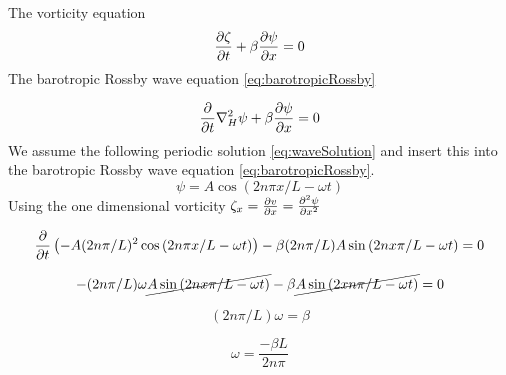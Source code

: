 The vorticity equation
\begin{equation}\label{eq:gov_vort}
    \pdv{\zeta}{t} + \beta \pdv{\psi}{x} = 0
\end{equation}
The barotropic Rossby wave equation \cref{eq:barotropicRossby}

\begin{equation}\label{eq:barotropicRossby}
    \frac{\partial}{\partial t}{} \nabla_H^2 \psi + \beta \pdv{\psi}{x} = 0
\end{equation}
We assume the following periodic solution \cref{eq:waveSolution} and
insert this into the barotropic Rossby wave equation \cref{eq:barotropicRossby}.
\begin{equation}\label{eq:waveSolution}
    \psi = A\cos{(2n\pi x /L - \omega t)}
\end{equation}
Using the one dimensional vorticity $\zeta_x = \pdv{v}{x} = \pdv[2]{\psi}{x}$

\begin{equation}
    \pdv{}{t} \left(-A (2n\pi/L)^2  \cos{(2n\pi x/L - \omega t)}\right) - \beta
     (2n\pi/L) A \sin{(2n x\pi/L - \omega t) = 0}
\end{equation}

\begin{equation}
    -(2n\pi/L)\omega \cancel{A\sin{(2n x\pi/L - \omega t)}} - \beta
    \cancel{A\sin{(2 xn\pi/L - \omega t)}} = 0
\end{equation}

\begin{equation}
    (2n\pi / L) \omega = \beta
\end{equation}

\begin{equation}\label{eq:omega1}
    \omega = \frac{-\beta L}{2n\pi}
\end{equation}

